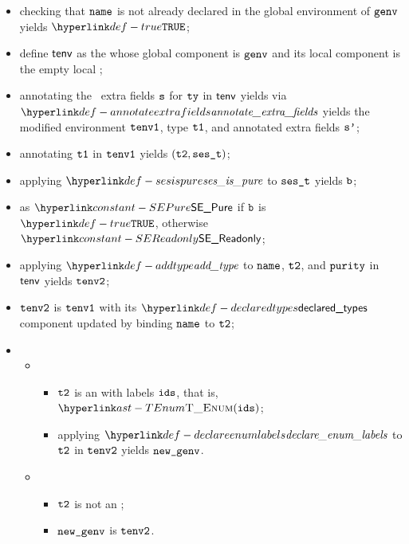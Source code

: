 \ProseParagraph
\AllApply
\begin{itemize}
  \item checking that $\texttt{name}$ is not already declared in the global environment of $\texttt{genv}$ yields $\True$\ProseOrTypeError;
  \item define $\textsf{tenv}$ as the \staticenvironmentterm{} whose global component is $\texttt{genv}$ and its local component is the empty local
        \staticenvironmentterm{};
  \item annotating the \optional\ extra fields $\texttt{s}$ for $\texttt{ty}$ in $\textsf{tenv}$ yields via \\ $\annotateextrafields$
        yields the modified environment $\texttt{tenv1}$, type $\texttt{t1}$, and annotated \optional{} extra fields $\texttt{s'}$\ProseOrTypeError;
  \item annotating $\texttt{t1}$ in $\texttt{tenv1}$ yields $(\texttt{t2}, \texttt{ses\_t})$\ProseOrTypeError;
  \item applying $\sesispure$ to $\texttt{ses\_t}$ yields $\texttt{b}$;
  \item \Proseeqdef{$\vpurity$} as $\SEPure$ if $\texttt{b}$ is $\True$, otherwise $\SEReadonly$;
  \item applying $\addtype$ to $\texttt{name}$, $\texttt{t2}$, and $\vpurity$ in $\textsf{tenv}$ yields $\texttt{tenv2}$;
  \item $\texttt{tenv2}$ is $\texttt{tenv1}$ with its $\declaredtypes$ component updated by binding $\texttt{name}$ to $\texttt{t2}$;
  \item \OneApplies
  \begin{itemize}
    \item {}
    \begin{itemize}
      \item $\texttt{t2}$ is an \enumerationtypeterm{} with labels $\texttt{ids}$, that is, $\TEnum(\ids)$;
      \item applying $\declareenumlabels$ to $\texttt{t2}$ in $\texttt{tenv2}$ yields $\texttt{new\_genv}$\ProseOrTypeError.
    \end{itemize}

    \item {}
    \begin{itemize}
      \item $\texttt{t2}$ is not an \enumerationtypeterm{};
      \item $\texttt{new\_genv}$ is $\texttt{tenv2}$.
    \end{itemize}
  \end{itemize}
\end{itemize}

